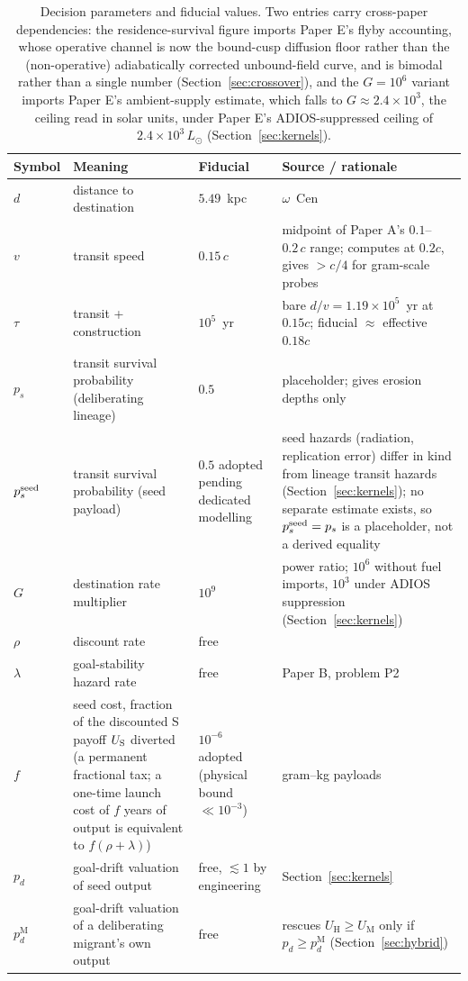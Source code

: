 \documentclass[11pt]{article}
\begin{document}
\begin{table}[tbp]
\centering
\caption{Decision parameters and fiducial values. Two entries carry cross-paper dependencies: the residence-survival figure imports Paper E's flyby accounting, whose operative channel is now the bound-cusp diffusion floor rather than the (non-operative) adiabatically corrected unbound-field curve, and is bimodal rather than a single number (Section~\ref{sec:crossover}), and the $G = 10^{6}$ variant imports Paper E's ambient-supply estimate, which falls to $G \approx 2.4\times10^{3}$, the ceiling read in solar units, under Paper E's ADIOS-suppressed ceiling of $2.4\times10^{3}\,L_\odot$ \citep{Swanson2026Engineered} (Section~\ref{sec:kernels}).}
\label{tab:params}
\small
\begin{tabular}{l p{4.4cm} p{3.2cm} p{4.6cm}}
\toprule
Symbol & Meaning & Fiducial & Source / rationale \\
\midrule
$d$ & distance to destination & $5.49$~kpc & $\omega$~Cen \citep{Haberle2025oMEGACatVI} \\
$v$ & transit speed & $0.15\,c$ & midpoint of Paper A's $0.1$--$0.2\,c$ range; \citet{Hoang2017} computes at $0.2c$, \citet{Lubin2016} gives $>c/4$ for gram-scale probes \\
$\tau$ & transit + construction & $10^{5}$~yr & bare $d/v = 1.19\times10^{5}$~yr at $0.15c$; fiducial $\approx$ effective $0.18c$ \\
$p_{s}$ & transit survival probability (deliberating lineage) & $0.5$ & placeholder; \citet{Hoang2017} gives erosion depths only \\
$p_{s}^{\rm seed}$ & transit survival probability (seed payload) & $0.5$ adopted pending dedicated modelling & seed hazards (radiation, replication error) differ in kind from lineage transit hazards (Section~\ref{sec:kernels}); no separate estimate exists, so $p_s^{\rm seed} = p_s$ is a placeholder, not a derived equality \\
$G$ & destination rate multiplier & $10^{9}$ & power ratio; $10^{6}$ without fuel imports, $10^{3}$ under ADIOS suppression (Section~\ref{sec:kernels}) \\
$\rho$ & discount rate & free & \citep{Ramsey1928,Bostrom2003} \\
$\lambda$ & goal-stability hazard rate & free & Paper B, problem P2 \\
$f$ & seed cost, fraction of the discounted S payoff $U_{\rm S}$ diverted (a permanent fractional tax; a one-time launch cost of $f$ years of output is equivalent to $f(\rho+\lambda)$) & $10^{-6}$ adopted (physical bound $\ll10^{-3}$) & gram--kg payloads \citep{Lubin2016,Freitas1980} \\
$p_{d}$ & goal-drift valuation of seed output & free, $\lesssim 1$ by engineering & Section~\ref{sec:kernels} \\
$p_{d}^{\mathrm M}$ & goal-drift valuation of a deliberating migrant's own output & free & rescues $U_{\mathrm H} \geq U_{\mathrm M}$ only if $p_d \geq p_d^{\mathrm M}$ (Section~\ref{sec:hybrid}) \\
\bottomrule
\end{tabular}
\end{table}
\end{document}
